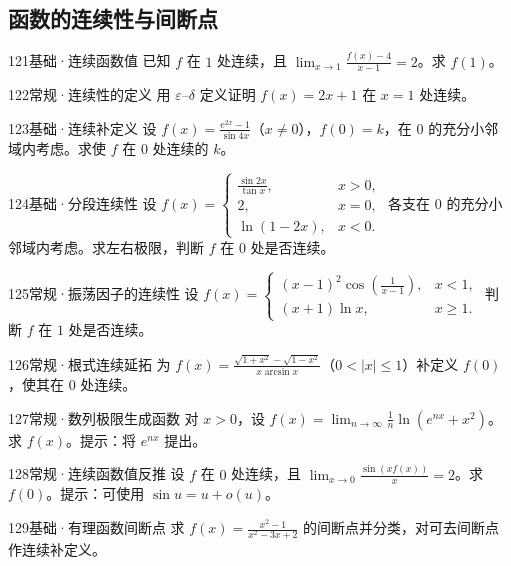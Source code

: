 \subsection{函数的连续性与间断点}
\begin{exercise}{121}{基础·连续函数值}
已知 $f$ 在 $1$ 处连续，且 $\lim_{x\to1}\frac{f(x)-4}{x-1}=2$。求 $f(1)$。
\end{exercise}
\begin{exercise}{122}{常规·连续性的定义}
用 $\varepsilon$--$\delta$ 定义证明 $f(x)=2x+1$ 在 $x=1$ 处连续。
\end{exercise}
\begin{exercise}{123}{基础·连续补定义}
设 $f(x)=\frac{e^{2x}-1}{\sin4x}$（$x\ne0$），$f(0)=k$，在 $0$ 的充分小邻域内考虑。求使 $f$ 在 $0$ 处连续的 $k$。
\end{exercise}
\begin{exercise}{124}{基础·分段连续性}
设 $f(x)=\begin{cases}\frac{\sin2x}{\tan x},&x>0,\\2,&x=0,\\\ln(1-2x),&x<0.\end{cases}$ 各支在 $0$ 的充分小邻域内考虑。求左右极限，判断 $f$ 在 $0$ 处是否连续。
\end{exercise}
\begin{exercise}{125}{常规·振荡因子的连续性}
设 $f(x)=\begin{cases}(x-1)^2\cos(\frac{1}{x-1}),&x<1,\\(x+1)\ln x,&x\ge1.\end{cases}$ 判断 $f$ 在 $1$ 处是否连续。
\end{exercise}
\begin{exercise}{126}{常规·根式连续延拓}
为 $f(x)=\frac{\sqrt{1+x^2}-\sqrt{1-x^2}}{x\arcsin x}$（$0<|x|\le1$）补定义 $f(0)$，使其在 $0$ 处连续。
\end{exercise}
\begin{exercise}{127}{常规·数列极限生成函数}
对 $x>0$，设 $f(x)=\lim_{n\to\infty}\frac1n\ln(e^{nx}+x^2)$。求 $f(x)$。提示：将 $e^{nx}$ 提出。
\end{exercise}
\begin{exercise}{128}{常规·连续函数值反推}
设 $f$ 在 $0$ 处连续，且 $\lim_{x\to0}\frac{\sin(xf(x))}{x}=2$。求 $f(0)$。提示：可使用 $\sin u=u+o(u)$。
\end{exercise}
\begin{exercise}{129}{基础·有理函数间断点}
求 $f(x)=\frac{x^2-1}{x^2-3x+2}$ 的间断点并分类，对可去间断点作连续补定义。
\end{exercise}
